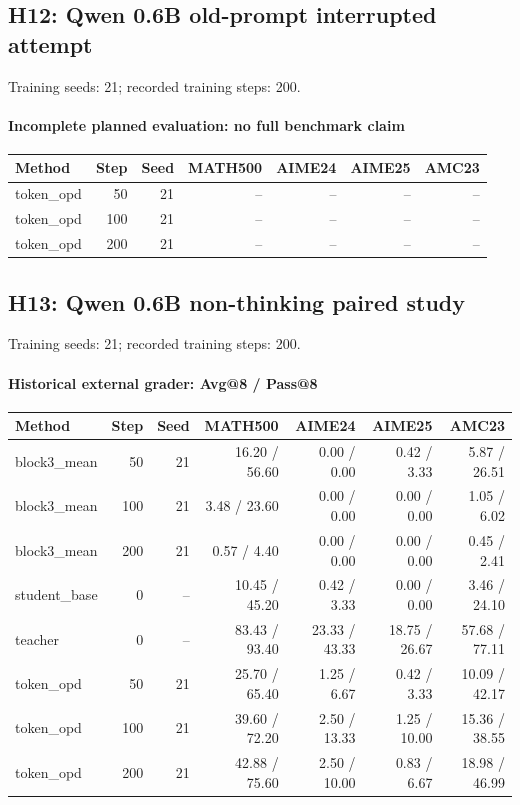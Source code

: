 \subsection{H12: Qwen 0.6B old-prompt interrupted attempt}
\label{history:qwen06_old_prompt}
Training seeds: 21; recorded training steps: 200.
\paragraph{Incomplete planned evaluation: no full benchmark claim}
{\footnotesize\setlength{\tabcolsep}{3.5pt}
\begin{longtable}{@{}p{1.4in}rrrrrr@{}}
\toprule
Method & Step & Seed & MATH500 & AIME24 & AIME25 & AMC23 \\
\midrule\endhead
token\_\allowbreak{}opd & 50 & 21 & -- & -- & -- & -- \\
token\_\allowbreak{}opd & 100 & 21 & -- & -- & -- & -- \\
token\_\allowbreak{}opd & 200 & 21 & -- & -- & -- & -- \\
\bottomrule\end{longtable}
}
\subsection{H13: Qwen 0.6B non-thinking paired study}
\label{history:qwen06_nonthinking}
Training seeds: 21; recorded training steps: 200.
\paragraph{Historical external grader: Avg@8 / Pass@8}
{\footnotesize\setlength{\tabcolsep}{3.5pt}
\begin{longtable}{@{}p{1.4in}rrrrrr@{}}
\toprule
Method & Step & Seed & MATH500 & AIME24 & AIME25 & AMC23 \\
\midrule\endhead
block3\_\allowbreak{}mean & 50 & 21 & 16.20 / 56.60 & 0.00 / 0.00 & 0.42 / 3.33 & 5.87 / 26.51 \\
block3\_\allowbreak{}mean & 100 & 21 & 3.48 / 23.60 & 0.00 / 0.00 & 0.00 / 0.00 & 1.05 / 6.02 \\
block3\_\allowbreak{}mean & 200 & 21 & 0.57 / 4.40 & 0.00 / 0.00 & 0.00 / 0.00 & 0.45 / 2.41 \\
student\_\allowbreak{}base & 0 & -- & 10.45 / 45.20 & 0.42 / 3.33 & 0.00 / 0.00 & 3.46 / 24.10 \\
teacher & 0 & -- & 83.43 / 93.40 & 23.33 / 43.33 & 18.75 / 26.67 & 57.68 / 77.11 \\
token\_\allowbreak{}opd & 50 & 21 & 25.70 / 65.40 & 1.25 / 6.67 & 0.42 / 3.33 & 10.09 / 42.17 \\
token\_\allowbreak{}opd & 100 & 21 & 39.60 / 72.20 & 2.50 / 13.33 & 1.25 / 10.00 & 15.36 / 38.55 \\
token\_\allowbreak{}opd & 200 & 21 & 42.88 / 75.60 & 2.50 / 10.00 & 0.83 / 6.67 & 18.98 / 46.99 \\
\bottomrule\end{longtable}
}
